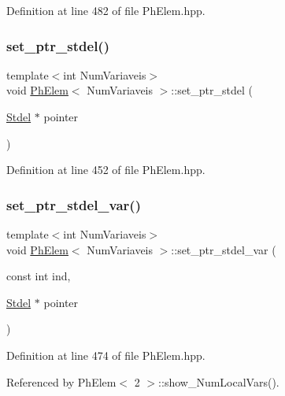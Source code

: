 Definition at line 482 of file Ph\+Elem.\+hpp.

\mbox{\label{classPhElem_a78130ee8d7d6ecf59f231dbd436e9081}} 
\subsubsection{\texorpdfstring{set\+\_\+ptr\+\_\+stdel()}{set\_ptr\_stdel()}\hspace{0.1cm}{\footnotesize\ttfamily [3/3]}}
{\footnotesize\ttfamily template$<$int Num\+Variaveis$>$ \\
void \hyperlink{classPhElem}{Ph\+Elem}$<$ Num\+Variaveis $>$\+::set\+\_\+ptr\+\_\+stdel (\begin{DoxyParamCaption}\item[{\hyperlink{classStdel}{Stdel} $\ast$}]{pointer }\end{DoxyParamCaption})}



Definition at line 452 of file Ph\+Elem.\+hpp.

\mbox{\label{classPhElem_a52fdbcf2283aacd8fdf9672018d74e4a}} 
\subsubsection{\texorpdfstring{set\+\_\+ptr\+\_\+stdel\+\_\+var()}{set\_ptr\_stdel\_var()}}
{\footnotesize\ttfamily template$<$int Num\+Variaveis$>$ \\
void \hyperlink{classPhElem}{Ph\+Elem}$<$ Num\+Variaveis $>$\+::set\+\_\+ptr\+\_\+stdel\+\_\+var (\begin{DoxyParamCaption}\item[{const int}]{ind,  }\item[{\hyperlink{classStdel}{Stdel} $\ast$}]{pointer }\end{DoxyParamCaption})}



Definition at line 474 of file Ph\+Elem.\+hpp.



Referenced by Ph\+Elem$<$ 2 $>$\+::show\+\_\+\+Num\+Local\+Vars().

